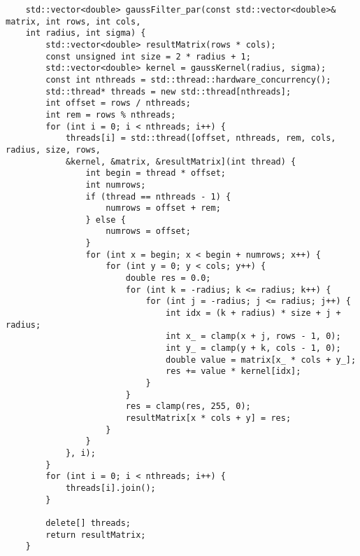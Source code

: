 \documentclass{report}
\begin{document}
\begin{lstlisting}
	std::vector<double> gaussFilter_par(const std::vector<double>& matrix, int rows, int cols,
	int radius, int sigma) {
		std::vector<double> resultMatrix(rows * cols);
		const unsigned int size = 2 * radius + 1;
		std::vector<double> kernel = gaussKernel(radius, sigma);
		const int nthreads = std::thread::hardware_concurrency();
		std::thread* threads = new std::thread[nthreads];
		int offset = rows / nthreads;
		int rem = rows % nthreads;
		for (int i = 0; i < nthreads; i++) {
			threads[i] = std::thread([offset, nthreads, rem, cols, radius, size, rows,
			&kernel, &matrix, &resultMatrix](int thread) {
				int begin = thread * offset;
				int numrows;
				if (thread == nthreads - 1) {
					numrows = offset + rem;
				} else {
					numrows = offset;
				}
				for (int x = begin; x < begin + numrows; x++) {
					for (int y = 0; y < cols; y++) {
						double res = 0.0;
						for (int k = -radius; k <= radius; k++) {
							for (int j = -radius; j <= radius; j++) {
								int idx = (k + radius) * size + j + radius;
								int x_ = clamp(x + j, rows - 1, 0);
								int y_ = clamp(y + k, cols - 1, 0);
								double value = matrix[x_ * cols + y_];
								res += value * kernel[idx];
							}
						}
						res = clamp(res, 255, 0);
						resultMatrix[x * cols + y] = res;
					}
				}
			}, i);
		}
		for (int i = 0; i < nthreads; i++) {
			threads[i].join();
		}
		
		delete[] threads;
		return resultMatrix;
	}
	
	
	
\end{lstlisting}
\end{document}
